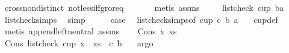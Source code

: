 \begin{isabellebody}
\ cross{}{\isacharunderscore}{\kern0pt}non{}{\isacharunderscore}{\kern0pt}distinct\ not{\isacharunderscore}{\kern0pt}less{\isacharunderscore}{\kern0pt}iff{\isacharunderscore}{\kern0pt}gr{\isacharunderscore}{\kern0pt}or{\isacharunderscore}{\kern0pt}eq\ \isanewline
\ \ \ \ \isamarkupfalse%
\ {\isacharparenleft}{\kern0pt}metis\ assms{\isacharparenleft}{\kern0pt}{}{\isacharparenright}{\kern0pt}{\isacharparenright}{\kern0pt}\ \isanewline
\ \ \isamarkupfalse%
\ {\isachardoublequoteopen}list{\isacharunderscore}{\kern0pt}check\ cup{}\ {\isacharbrackleft}{\kern0pt}b{\isacharcomma}{\kern0pt}a{\isacharbrackright}{\kern0pt}{\isachardoublequoteclose}\ \isamarkupfalse%
\ list{\isacharunderscore}{\kern0pt}check{\isachardot}{\kern0pt}simps{\isacharparenleft}{\kern0pt}{}{\isacharparenright}{\kern0pt}\ \isamarkupfalse%
\ simp\isanewline
\ \ \isamarkupfalse%
\ \isamarkupfalse%
\ {\isacharquery}{\kern0pt}case\ \isamarkupfalse%
\ list{\isacharunderscore}{\kern0pt}check{\isachardot}{\kern0pt}simps{\isacharparenleft}{\kern0pt}{}{\isacharparenright}{\kern0pt}{\isacharbrackleft}{\kern0pt}of\ {\isachardoublequoteopen}cup{}{\isachardoublequoteclose}\ c\ b\ a\ {\isachardoublequoteopen}{\isacharbrackleft}{\kern0pt}{\isacharbrackright}{\kern0pt}{\isachardoublequoteclose}{\isacharbrackright}{\kern0pt}\ \isamarkupfalse%
\ cup{}{\isacharunderscore}{\kern0pt}def\isanewline
\ \ \ \ \isamarkupfalse%
\ {\isacharparenleft}{\kern0pt}metis\ append{\isachardot}{\kern0pt}left{\isacharunderscore}{\kern0pt}neutral\ assms{\isacharparenleft}{\kern0pt}{}{\isacharparenright}{\kern0pt}{\isacharparenright}{\kern0pt}\isanewline
{}\isamarkupfalse%
\isanewline
\ \ \isamarkupfalse%
\ {\isacharparenleft}{\kern0pt}Cons\ x\ xs{\isacharparenright}{\kern0pt}\isanewline
\ \ \isamarkupfalse%
\ Cons{}{\isacharcolon}{\kern0pt}{\isachardoublequoteopen}\ list{\isacharunderscore}{\kern0pt}check\ cup{}\ {\isacharparenleft}{\kern0pt}{\isacharparenleft}{\kern0pt}x\ {\isacharhash}{\kern0pt}\ xs{\isacharparenright}{\kern0pt}\ {\isacharat}{\kern0pt}\ {\isacharbrackleft}{\kern0pt}c{\isacharcomma}{\kern0pt}\ b{\isacharbrackright}{\kern0pt}{\isacharparenright}{\kern0pt}{\isachardoublequoteclose}\ \ \isamarkupfalse%
\ argo\isanewline
\ \ \isamarkupfalse%

\end{isabellebody}
